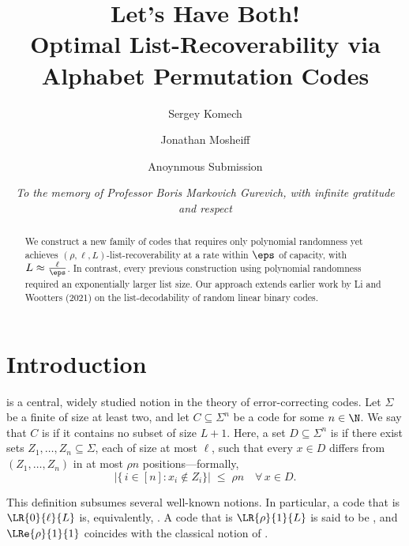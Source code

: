 \documentclass[11pt]{article}
\title{Let's Have Both! \\Optimal List-Recoverability via Alphabet Permutation Codes}
\author[1]{Sergey Komech}
\author[1]{Jonathan Mosheiff}
\affil[1]{Department of Computer Science, Ben-Gurion University}
\date{\small{\it{To the memory of Professor Boris Markovich Gurevich, with infinite gratitude and respect}}}
\author{Anoynmous Submission}
\date{}
\begin{document}
	
	\maketitle
	
	\ifauthors	{}
	\fi
	
	\thispagestyle{empty}	
	\begin{abstract}
        We construct a new family of codes that requires only polynomial randomness yet achieves \((\rho,\ell,L)\)-list-recoverability at a rate within \(\eps\) of capacity, with \(L \approx \tfrac{\ell}{\eps}\). In contrast, every previous construction using polynomial randomness required an exponentially larger list size. Our approach extends earlier work by Li and Wootters (2021) on the list-decodability of random linear binary codes.
	\end{abstract}




	
    \clearpage
	\setcounter{page}{1}


\section{Introduction}

 is a central, widely studied notion in the theory of error-correcting codes. Let $\Sigma$ be a finite  of size at least two, and let $C \subseteq \Sigma^n$ be a code for some $n \in \N$. We say that $C$ is  if it contains no  subset of size $L+1$. Here, a set $D \subseteq \Sigma^n$ is  if there exist sets $Z_1, \dots, Z_n \subseteq \Sigma$, each of size at most $\ell$, such that every $x \in D$ differs from $(Z_1,\dots,Z_n)$ in at most $\rho n$ positions—formally,
\[
\bigl|\{\,i \in [n] : x_i \notin Z_i \}\bigr|
\;\le\;
\rho n
\quad
\forall\,x \in D.
\]


\sloppy
This definition subsumes several well-known notions. In particular, a code that is $\LR{0}{\ell}{L}$ is, equivalently, . A code that is $\LR{\rho}{1}{L}$ is said to be , and $\LRe{\rho}{1}{1}$ coincides with the classical notion of . 
\end{document}
